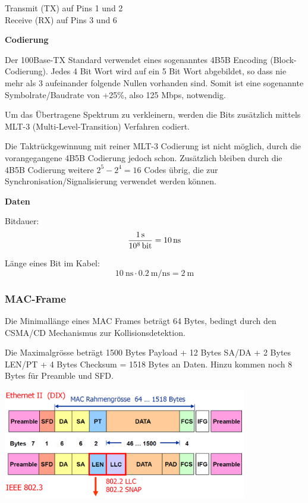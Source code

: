 Transmit (TX) auf Pins 1 und 2\\
Receive (RX) auf Pins 3 und 6

\textbf{Codierung}

Der 100Base-TX Standard verwendet eines sogenanntes 4B5B Encoding
(Block-Codierung). Jedes 4 Bit Wort wird auf ein 5 Bit Wort abgebildet, so dass
nie mehr als 3 aufeinander folgende Nullen vorhanden sind. Somit ist eine
sogenannte Symbolrate/Baudrate von +25\%, also 125 Mbps, notwendig.

Um das Übertragene Spektrum zu verkleinern, werden die Bits zusätzlich mittels
MLT-3 (Multi-Level-Transition) Verfahren codiert.

Die Taktrückgewinnung mit reiner MLT-3 Codierung ist nicht möglich, durch die
vorangegangene 4B5B Codierung jedoch schon. Zusätzlich bleiben durch die 4B5B
Codierung weitere $2^5-2^4=16$ Codes übrig, die zur
Synchronisation/Signalisierung verwendet werden können.

\textbf{Daten}

Bitdauer:
\[
	\frac{\SI{1}{\second}}{\SI{e8}{\bit}} = \SI{10}{\ns}
\]

Länge eines Bit im Kabel:
\[
	\SI{10}{\ns} \cdot \SI{0.2}{\meter\per\ns} = \SI{2}{\meter}
\]


\subsubsection{MAC-Frame}

Die Minimallänge eines MAC Frames beträgt 64 Bytes, bedingt durch den CSMA/CD
Mechanismus zur Kollisionsdetektion.

Die Maximalgrösse beträgt 1500 Bytes Payload + 12 Bytes SA/DA + 2 Bytes LEN/PT +
4 Bytes Checksum = 1518 Bytes an Daten. Hinzu kommen noch 8 Bytes für Preamble
und SFD.

\begin{center}
	\includegraphics[width=0.8\textwidth]{media/MACFrame.png}
\end{center}

